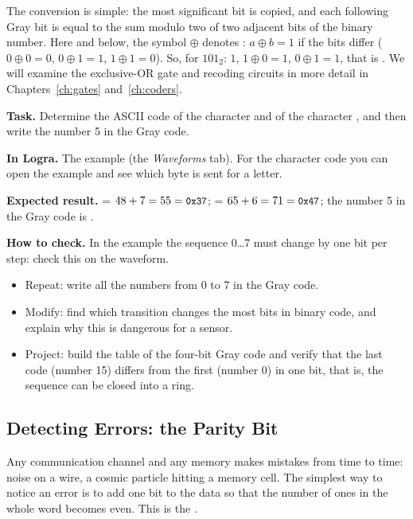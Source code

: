 The conversion is simple: the most significant bit is copied, and each following Gray bit is equal to
the sum modulo two of two adjacent bits of the binary number. Here and below,
the symbol $\oplus$ denotes : $a\oplus b=1$ if the
bits differ ($0\oplus 0=0$, $0\oplus 1=1$, $1\oplus 1=0$). So, for
$101_2$: $1$, $1\oplus 0=1$, $0\oplus 1=1$, that is . We will examine the
exclusive-OR gate and recoding circuits in more detail in
Chapters~\ref{ch:gates} and~\ref{ch:coders}. 

\begin{diybox}
\textbf{Task.} Determine the ASCII code of the character  and of the character ,
and then write the number 5 in the Gray code.\par
\textbf{In Logra.} The  example (the \emph{Waveforms} tab).
For the character code you can open the  example and see which byte
is sent for a letter.\par
\textbf{Expected result.}  = $48+7=55=\texttt{\small 0x37}$;
 = $65+6=71=\texttt{\small 0x47}$; the number 5 in the Gray code is .\par
\textbf{How to check.} In the  example the sequence 0\ldots 7
must change by one bit per step: check this on the waveform.
\begin{itemize}[leftmargin=3.4em,labelwidth=3em,labelsep=0.4em,align=left]
  \item[\stars{1}] Repeat: write all the numbers from 0 to 7 in the Gray code.
  \item[\stars{2}] Modify: find which transition changes the most
    bits in binary code, and explain why this is dangerous for a sensor.
  \item[\stars{3}] Project: build the table of the four-bit Gray code and
    verify that the last code (number 15) differs from the first (number 0)
    in one bit, that is, the sequence can be closed into a ring.
\end{itemize}
\end{diybox}

\subsection{Detecting Errors: the Parity Bit}

Any communication channel and any memory makes mistakes from time to time: noise on a wire, a
cosmic particle hitting a memory cell. The simplest way to notice an
error is to add one bit to the data so that the number of ones in the whole word
becomes even. This is the .

